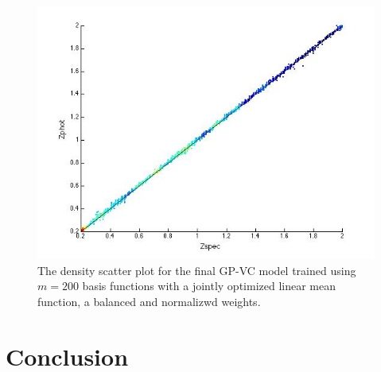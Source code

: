 \documentclass[useAMS,usenatbib,fleqn]{mn2e}
\begin{document}
\begin{figure}
       \centering
        \includegraphics[trim = 30px 10px 20px 20px, clip=true,width=1\columnwidth]{figures/final-model.jpg}
        \caption{The density scatter plot for the final GP-VC model trained using $m=200$ basis functions with a jointly optimized linear mean function, a balanced and normalizwd weights. } 
       \label{fig-final-model}
\end{figure}

\section{Conclusion}
\label{sec-conclusion}

\footnotesize{

	
}
\end{document}
